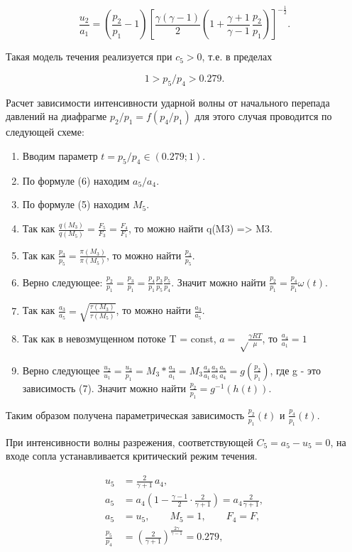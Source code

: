 \documentclass[12pt,a4paper]{article}
\begin{document}
\begin{equation}\label{eq:83}
\frac{u_2}{a_1} = \left(\frac{p_2}{p_1}-1\right)\left[\frac{\gamma(\gamma-1)}{2}\left(1+\frac{\gamma+1}{\gamma-1}\,\frac{p_2}{p_1}\right)\right]^{-\frac{1}{2}}.
\end{equation}

Такая модель течения реализуется при \(c_5 > 0\), т.е. в пределах

\[
1 > p_5/p_4 > 0.279.
\]

Расчет зависимости интенсивности ударной волны от начального перепада давлений на диафрагме \(p_2/p_1 = f(p_4/p_1)\) для этого случая проводится по следующей схеме:
\begin{enumerate}
    \item Вводим параметр \(t = p_5/p_4 \in (0.279; 1)\). 
    \item По формуле (6) находим \(a_5/a_4\).
    \item По формуле (5) находим \(M_5\).
    \item  Так как $\frac{q(M_3)}{q(M_5)} = \frac{F_5}{F_3} = \frac{F_4}{F_1}$, то можно найти q(M3) => M3.
    \item Так как $\frac{p_3}{p_5} = \frac{\pi(M_3)}{\pi(M_5)}$, то можно найти $\frac{p_3}{p_5}$.
    \item Верно следующее: $\frac{p_2}{p_1} = \frac{p_3}{p_1} = \frac{p_4}{p_1} \frac{p_3}{p_5} \frac{p_5}{p_4}$. Значит можно найти $\frac{p_2}{p_1} = \frac{p_4}{p_1} \omega(t)$.
    \item Так как $\frac{a_3}{a_5} = \sqrt{\frac{\tau(M_3)}{\tau(M_5)}}$, то можно найти $\frac{a_3}{a_5}$.
    \item Так как в невозмущенном потоке T = const, $a = \sqrt\frac{\gamma R T}{\mu}$, то $\frac{a_4}{a_1} = 1$
    \item Верно следующее $\frac{u_2}{u_1} = \frac{u_3}{p_1} = M_3 * \frac{a_3}{a_1} = M_3 \frac{a_4}{a_1} \frac{a_3}{a_5} \frac{a_5}{a_4} = g(\frac{p_2}{p_1})$, где g - это зависимость (7). Значит можно найти $\frac{p_2}{p_1} = g^{-1}(h(t))$.
\end{enumerate}

Таким образом получена параметрическая зависимость $\frac{p_2}{p_1}(t)$ и $\frac{p_4}{p_1}(t)$.

При интенсивности волны разрежения, соответствующей \(C_5 = a_5 - u_5 = 0\), на входе сопла устанавливается критический режим течения.

\[
\begin{aligned}
u_5 &= \frac{2}{\gamma+1}\,a_4,\\[2mm]
a_5 &= a_4\left(1-\frac{\gamma-1}{2}\cdot\frac{2}{\gamma+1}\right)=a_4\frac{2}{\gamma+1},\\[2mm]
a_5 &= u_5,\qquad M_5 = 1,\qquad F_4 = F,\\[2mm]
\frac{p_5}{p_4} &= \left(\frac{2}{\gamma+1}\right)^{\frac{2\gamma}{\gamma-1}} = 0.279,\\[2mm]
\end{aligned}
\]
\end{document}
